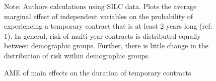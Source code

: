 \documentclass[12pt]{article}
\begin{document}
\clearpage
\begin{figure}
    \caption{AME of main effects on the duration of temporary contracts}
    \label{graph_glm_mfx_dur}
    \footnotesize{Note: Authors calculations using SILC data.  Plots the average marginal effect of independent variables on the probability of experiencing a temporary contract that is at least 2 years long (ref: 1). In general, risk of multi-year contracts is distributed equally between demographic groups.  Further, there is little change in the distribution of risk within demographic groups.}
\end{figure}



\clearpage
\singlespacing




\clearpage
\appendix
\setcounter{table}{0}
\setcounter{figure}{0}
\renewcommand*\thetable{\Alph{section}.\arabic{table}}
\renewcommand*\thefigure{\Alph{section}.\arabic{figure}}
\renewcommand{\theHfigure}{\Alph{section}.\arabic{table}}
\renewcommand{\theHtable}{\Alph{section}.\arabic{figure}}


\end{document}

